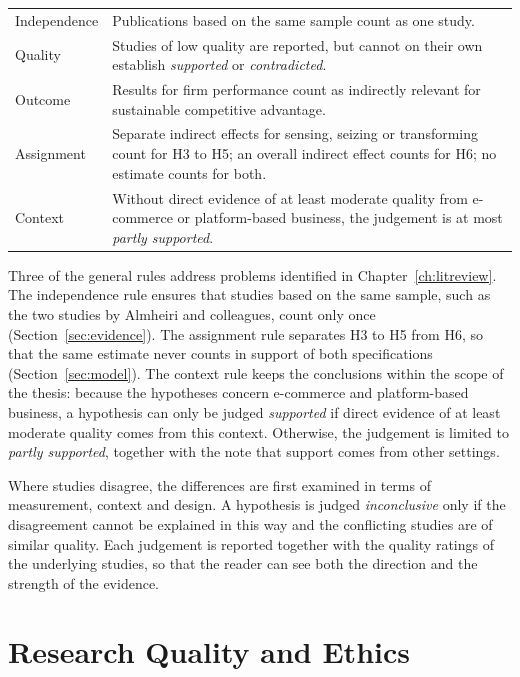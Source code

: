 \begin{table}[htbp]
\begin{tabularx}{\textwidth}{|>{\raggedright\arraybackslash}p{2.8cm}|>{\raggedright\arraybackslash}X|}
\hline
\multicolumn{2}{|l|}{\textbf{Panel C: General rules}} \\
\hline
Independence & Publications based on the same sample count as one study. \\ \hline
Quality & Studies of low quality are reported, but cannot on their own establish \textit{supported} or \textit{contradicted}. \\ \hline
Outcome & Results for firm performance count as indirectly relevant for sustainable competitive advantage. \\ \hline
Assignment & Separate indirect effects for sensing, seizing or transforming count for H3 to H5; an overall indirect effect counts for H6; no estimate counts for both. \\ \hline
Context & Without direct evidence of at least moderate quality from e-commerce or platform-based business, the judgement is at most \textit{partly supported}. \\
\hline
\end{tabularx}
\end{table}

Three of the general rules address problems identified in Chapter~\ref{ch:litreview}. The independence rule ensures that studies based on the same sample, such as the two studies by Almheiri and colleagues, count only once (Section~\ref{sec:evidence}). The assignment rule separates H3 to H5 from H6, so that the same estimate never counts in support of both specifications (Section~\ref{sec:model}). The context rule keeps the conclusions within the scope of the thesis: because the hypotheses concern e-commerce and platform-based business, a hypothesis can only be judged \textit{supported} if direct evidence of at least moderate quality comes from this context. Otherwise, the judgement is limited to \textit{partly supported}, together with the note that support comes from other settings.

Where studies disagree, the differences are first examined in terms of measurement, context and design. A hypothesis is judged \textit{inconclusive} only if the disagreement cannot be explained in this way and the conflicting studies are of similar quality. Each judgement is reported together with the quality ratings of the underlying studies, so that the reader can see both the direction and the strength of the evidence.

\section{Research Quality and Ethics}
\label{sec:quality}

